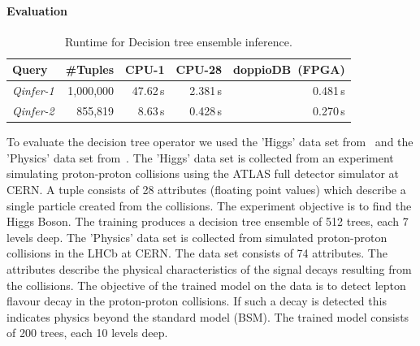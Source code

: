 \documentclass[11pt,dvipdfm]{article}
\newcommand{\centercell}[1]{\multicolumn{1}{c|}{#1}}
\newcommand{\head}[1]{\centercell{\textbf{#1}}}
\newcommand{\headlast}[1]{\multicolumn{1}{c}{\textbf{#1}}}
\begin{document}
\paragraph{\textbf{Evaluation}}

\begin{table}[tp]
	\centering
	\caption{Runtime for Decision tree ensemble inference.}
	\def\arraystretch{1.2}
	\begin{tabular}{l|r|r|r|r}
		\textbf{Query} & \head{\#Tuples} & \head{CPU-1} & \head{CPU-28} & \headlast{doppioDB~(FPGA)} \\ \hline 
		\emph{Qinfer-1}& 1,000,000 &  47.62\,s & 2.381\,s & 0.481\,s \\ 
		\emph{Qinfer-2}& 855,819 & 8.63\,s & 0.428\,s  & 0.270\,s \\  
	\end{tabular} 
	\label{tab:dt-result}
\end{table}

To evaluate the decision tree operator we used the 'Higgs' data set from~\cite{salimans2014} and the 'Physics' data set from~\cite{pyhsics2015}.  
The 'Higgs' data set is collected from an experiment simulating proton-proton collisions using the ATLAS full detector simulator at CERN.  A tuple consists of 28 attributes (floating point values) which describe a single particle created from the collisions. 
The experiment objective is to find the Higgs Boson. The training produces a decision tree ensemble of 512 trees, each 7 levels deep.
The 'Physics' data set is  collected from simulated proton-proton collisions in the LHCb at CERN. The data set consists of 74 attributes. The attributes describe the physical characteristics of the signal decays resulting from the collisions. The objective of the trained model on the data is to detect lepton flavour decay in the proton-proton collisions. If such a decay is detected this indicates physics beyond the standard model (BSM). 
The trained model consists of 200 trees, each 10 levels deep.
\end{document}
